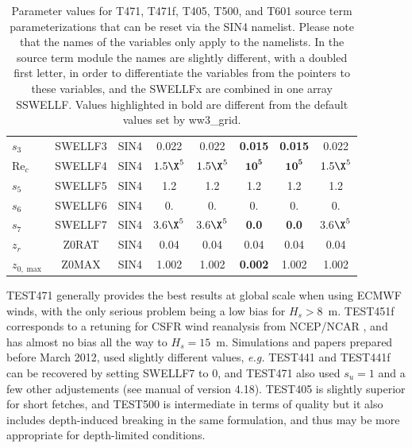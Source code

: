 \begin{landscape}
\begin{table}
\begin{center}
\begin{tabular}{|l|c|c|c|c|c|c|c|}
  $s_3$ &  SWELLF3                    & SIN4 &  0.022  &  0.022      &\textbf{0.015} &\textbf{0.015}&  0.022      \\
  $\mathrm{Re}_c$ &  SWELLF4          & SIN4 &$1.5\X^5$& $1.5\X^5$   &$\mathbf{10^5}$&$\mathbf{10^5}$&  $1.5\X^5$ \\
  $s_5$ &  SWELLF5                    & SIN4 & 1.2     & 1.2         & 1.2           &  1.2         & 1.2         \\
  $s_6$ &  SWELLF6                    & SIN4 & 0.      & 0.          & 0.            & 0.           & 0.          \\
  $s_7$ &  SWELLF7                    & SIN4 &3.6$\X^5$&3.6$\X^5$    &\textbf{0.0}   &\textbf{0.0}  & 3.6$\X^5$   \\
  $z_r$ &  Z0RAT                      & SIN4 & 0.04    & 0.04        & 0.04          &  0.04        &   0.04      \\
  $z_{0,\max}$ &  Z0MAX               & SIN4 & 1.002   & 1.002       &\textbf{0.002} &  1.002       &  1.002      \\
\hline
\end{tabular}



 \end{center}
\caption{Parameter values for T471, T471f, T405, T500, and T601 source 
term parameterizations that can be reset via the {\F SIN4} namelist. 
Please note that the names of the variables only apply to the namelists. In the
source term module the names are slightly different, with a doubled first
letter, in order to differentiate the variables from the pointers to these
variables, and the SWELLFx are combined in one array SSWELLF. Values highlighted in bold are
different from the default values set by ww3\_grid.} \label{tab:ST4_parSIN}
\end{table}
\end{landscape}

TEST471 generally provides the best results at global scale when using ECMWF winds,
with the only serious problem being a low bias for $H_s > 8$~m.  TEST451f
corresponds to a retuning for CSFR wind reanalysis from NCEP/NCAR
\citep{art:CFSRR10}, and has almost no bias all the way to $H_s =
15$~m. Simulations and papers prepared before March 2012, used slightly
different values, {\it e.g.} TEST441 and TEST441f can be recovered by setting SWELLF7 to 0, and 
TEST471 also used $s_u=1$ and a few other adjustements (see manual of version 4.18).
TEST405 is slightly superior for short fetches, and TEST500 is intermediate in
terms of quality but it also includes depth-induced breaking in the same
formulation, and thus may be more appropriate for depth-limited conditions.


